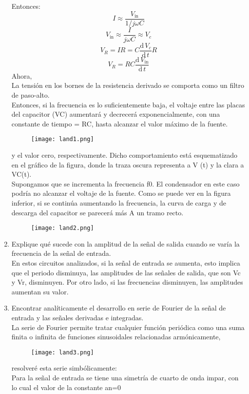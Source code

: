 \documentclass[a4paper,12pt]{report}
\begin{document}
\begin{enumerate}
Entonces:
$$
I \approx \frac{V_{\mathrm{in}}}{1/j\omega C}
$$
$$
V_{\mathrm{in}} \approx \frac{I}{j\omega C} \approx V_{c}
$$
$$
V_{R} = IR = C\frac{\mathrm{d}\,V_{c}}{\mathrm{d}\,t}R
$$
$$
V_{R} = RC\frac{\mathrm{d}\,V_{\mathrm{in}}}{\mathrm{d}\,t}
$$
Ahora,\\
La tensión en los bornes de la resistencia derivado se comporta como un filtro de paso-alto.\\
Entonces, si la frecuencia es lo suficientemente baja, el voltaje entre las placas del capacitor (VC) aumentará y decrecerá exponencialmente, con una constante de tiempo = RC, hasta alcanzar el valor máximo de la fuente.
\begin{figure}[H]
\centering
\texttt{[image: land1.png]}
\end{figure}
y el valor cero, respectivamente. Dicho comportamiento está esquematizado en el gráfico de la figura, donde la traza oscura representa a V (t) y la clara a VC(t).\\
Supongamos que se incrementa la frecuencia f0. El condensador en este caso podría no alcanzar el voltaje de la fuente. Como se puede ver en la figura inferior, si se continúa aumentando la frecuencia, la curva de carga y de descarga del capacitor se parecerá más A un tramo recto.
\begin{figure}[H]
\centering
\texttt{[image: land2.png]}
\end{figure}
\item Explique qué sucede con la amplitud de la señal de salida cuando se varía la frecuencia de la señal de entrada.\\
En estos circuitos analizados, si la señal de entrada se aumenta, esto implica que el periodo disminuya, las amplitudes de las señales de salida, que son Vc y Vr, disminuyen. Por otro lado, si las frecuencias disminuyen, las amplitudes aumentan su valor. 
\item Encontrar analíticamente el desarrollo en serie de Fourier de la señal de entrada y las señales derivadas e integradas.\\
La serie de Fourier permite tratar cualquier función periódica como una suma finita o infinita de funciones sinusoidales relacionadas armónicamente,
\begin{figure}[H]
\centering
\texttt{[image: land3.png]}
\end{figure}
resolveré esta serie simbólicamente:\\
Para la señal de entrada se tiene una simetría de cuarto de onda impar, con lo cual el valor de la constante an=0\\

\end{enumerate}
\end{document}
